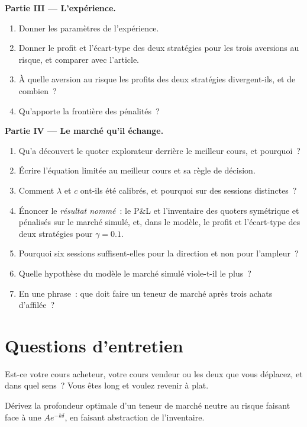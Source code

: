 \begin{problem}
\medskip\noindent\textbf{Partie III --- L'expérience.}
\begin{enumerate}[resume]
\item Donner les paramètres de l'expérience.
\item Donner le profit et l'écart-type des deux stratégies pour les trois aversions au risque, et comparer avec l'article.
\item À quelle aversion au risque les profits des deux stratégies divergent-ils, et de combien~?
\item Qu'apporte la frontière des pénalités~?
\end{enumerate}

\medskip\noindent\textbf{Partie IV --- Le marché qu'il échange.}
\begin{enumerate}[resume]
\item Qu'a découvert le quoter explorateur derrière le meilleur cours, et pourquoi~?
\item Écrire l'équation limitée au meilleur cours et sa règle de décision.
\item Comment $\lambda$ et $c$ ont-ils été calibrés, et pourquoi sur des sessions distinctes~?
\item Énoncer le \emph{résultat nommé}~: le P\&L et l'inventaire des quoters symétrique et pénalisés sur le marché simulé, et, dans le modèle, le
profit et l'écart-type des deux stratégies pour $\gamma=0.1$.
\item Pourquoi six sessions suffisent-elles pour la direction et non pour l'ampleur~?
\item Quelle hypothèse du modèle le marché simulé viole-t-il le plus~?
\item En une phrase~: que doit faire un teneur de marché après trois achats d'affilée~?
\end{enumerate}
\end{problem}

\section{Questions d'entretien}

\begin{interviewq}\label{iq:hf:inventory-models:1}
Est-ce votre cours acheteur, votre cours vendeur ou les deux que vous déplacez, et dans quel sens~? Vous êtes long et voulez revenir à plat.
\end{interviewq}

\begin{interviewq}\label{iq:hf:inventory-models:2}
Dérivez la profondeur optimale d'un teneur de marché neutre au risque faisant face à une  $Ae^{-k\delta}$, en faisant abstraction de l'inventaire.
\end{interviewq}

